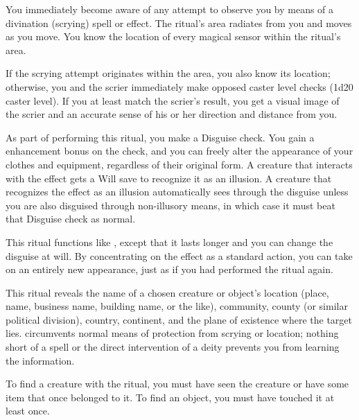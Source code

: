\spelldur{\durext}
\spelleffect You immediately become aware of any attempt to observe you by means of a divination (scrying) spell or effect. The ritual's area radiates from you and moves as you move. You know the location of every magical sensor within the ritual's area.
\par If the scrying attempt originates within the area, you also know its location; otherwise, you and the scrier immediately make opposed caster level checks (1d20 \add caster level). If you at least match the scrier's result, you get a visual image of the scrier and an accurate sense of his or her direction and distance from you.

\spelldur{\durlong \dismissable}
\spelleffect As part of performing this ritual, you make a Disguise check. You gain a  enhancement bonus on the check, and you can freely alter the appearance of your clothes and equipment, regardless of their original form.
\spellnotes A creature that interacts with the effect gets a Will save to recognize it as an illusion. A creature that recognizes the effect as an illusion automatically sees through the disguise unless you are also disguised through non-illusory means, in which case it must beat that Disguise check as normal.

\spelldur{\durext \dismissable}
\spelleffect This ritual functions like , except that it lasts longer and you can change the disguise at will. By concentrating on the effect as a standard action, you can take on an entirely new appearance, just as if you had performed the  ritual again.

\spelleffect This ritual reveals the name of a chosen creature or object's location (place, name, business name, building name, or the like), community, county (or similar political division), country, continent, and the plane of existence where the target lies.  circumvents normal means of protection from scrying or location; nothing short of a  spell or the direct intervention of a deity prevents you from learning the information.
\par To find a creature with the ritual, you must have seen the creature or have some item that once belonged to it. To find an object, you must have touched it at least once.

